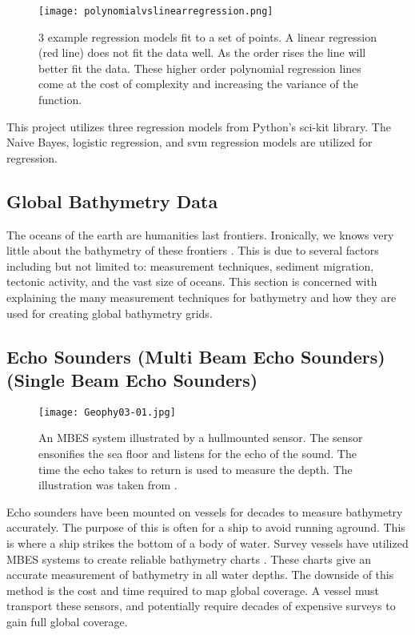 \begin{figure}[htp]
    \centering
    \texttt{[image: polynomialvslinearregression.png]}
    \caption{3 example regression models fit to a set of points.
    A linear regression (red line) does not fit the data well.
    As the order rises the line will better fit the data.
    These higher order polynomial regression lines come at the cost of complexity and increasing the variance of the function.}
    \label{fig:repressionexample}
\end{figure}


This project utilizes three regression models from Python's sci-kit library.
The Naive Bayes\cite{sklearn_api}, logistic regression\cite{sklearn_api}, and svm regression\cite{sklearn_api} models are utilized for regression.

\subsection{Global Bathymetry Data}
The oceans of the earth are humanities last frontiers.
Ironically, we knows very little about the bathymetry of these frontiers \cite{becker2009global}.
This is due to several factors including but not limited to: measurement techniques, sediment migration, tectonic activity, and the vast size of oceans.
This section is concerned with explaining the many measurement techniques for bathymetry and how they are used for creating global bathymetry grids.

\subsection{Echo Sounders (Multi Beam Echo Sounders)(Single Beam Echo Sounders) }

\begin{figure}[htp]
    \centering
    \texttt{[image: Geophy03-01.jpg]}
    \caption{An \ac{MBES} system illustrated by a hull\-mounted sensor.
    The sensor ensonifies the sea floor and listens for the echo of the sound.
    The time the echo takes to return is used to measure the depth. 
    The illustration was taken from \cite{monacoWeb}.}
    \label{fig:MBES}
\end{figure}

Echo sounders have been mounted on vessels for decades to measure bathymetry accurately.
The purpose of this is often for a ship to avoid running aground.
This is where a ship strikes the bottom of a body of water.
Survey vessels have utilized \ac{MBES} systems to create reliable bathymetry charts \cite{farr1980multibeam}.
These charts give an accurate measurement of bathymetry in all water depths.
The downside of this method is the cost and time required to map global coverage.
A vessel must transport these sensors, and potentially require decades of expensive surveys to gain full global coverage.


